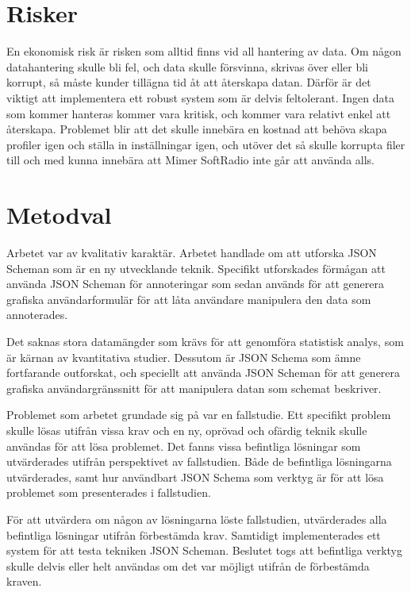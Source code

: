 \section{Risker}
\label{sec:intro:risker}
En ekonomisk risk är risken som alltid finns vid all hantering av data. Om någon datahantering skulle bli fel, och data skulle försvinna, skrivas över eller bli korrupt, så måste kunder tillägna tid åt att återskapa datan. Därför är det viktigt att implementera ett robust system som är delvis feltolerant. Ingen data som kommer hanteras kommer vara kritisk, och kommer vara relativt enkel att återskapa. Problemet blir att det skulle innebära en kostnad att behöva skapa profiler igen och ställa in inställningar igen, och utöver det så skulle korrupta filer till och med kunna innebära att Mimer SoftRadio inte går att använda alls.

\section{Metodval}
\label{sec:intro:metodval}
Arbetet var av kvalitativ karaktär. Arbetet handlade om att utforska JSON Scheman som är en ny utvecklande teknik. Specifikt utforskades förmågan att använda JSON Scheman för annoteringar som sedan används för att generera grafiska användarformulär för att låta användare manipulera den data som annoterades. 

Det saknas stora datamängder som krävs för att genomföra statistisk analys, som är kärnan av kvantitativa studier. Dessutom är JSON Schema som ämne fortfarande outforskat, och speciellt att använda JSON Scheman för att generera grafiska användargränssnitt för att manipulera datan som schemat beskriver.

Problemet som arbetet grundade sig på var en fallstudie. Ett specifikt problem skulle lösas utifrån vissa krav och en ny, oprövad och ofärdig teknik skulle användas för att lösa problemet. Det fanns vissa befintliga lösningar som utvärderades utifrån perspektivet av fallstudien. Både de befintliga lösningarna utvärderades, samt hur användbart JSON Schema som verktyg är för att lösa problemet som presenterades i fallstudien.

För att utvärdera om någon av lösningarna löste fallstudien, utvärderades alla befintliga lösningar utifrån förbestämda krav. Samtidigt implementerades ett system för att testa tekniken JSON Scheman. Beslutet togs att befintliga verktyg skulle delvis eller helt användas om det var möjligt utifrån de förbestämda kraven.

